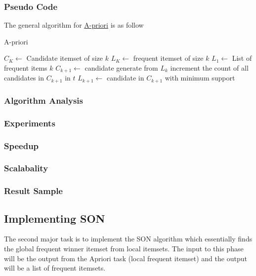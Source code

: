 \documentclass[11pt]{article}
\begin{document}
\subsubsection {Pseudo Code}
The general algorithm for \href{https://www3.cs.stonybrook.edu/~cse634/lecture_notes/07apriori.pdf}{A-priori} is as follow \\

\begin{algorithm}[H]
    \caption{A-priori}

    \begin{algorithmic}[1]
        \State $C_K \gets $ Candidate itemset of size $k$
        \State $L_K \gets $ frequent itemset of size $k$
        \State
        \State $L_1 \gets $ List of frequent items $k$
        \State
        \State
            \State $C_{k+1} \gets $ candidate generate from $L_k$
                \State increment the count of all candidates in $C_{k+1}$ in $t$
            \EndFor
            \State $L_{k+1} \gets$ candidate in $C_{k+1}$ with minimum support
        \EndFor
    \end{algorithmic}
\end{algorithm}

\subsubsection {Algorithm Analysis}
\subsubsection {Experiments}
\subsubsection {Speedup}
\subsubsection {Scalabality}
\subsubsection {Result Sample}
 
\subsection{Implementing SON}

The second major task is to implement the SON algorithm which essentially finds the global frequent winner itemset from local itemsets. The input to this phase will be the output from the Apriori task (local frequent itemset) and the output will be a list of frequent itemsets.\\
\end{document}
